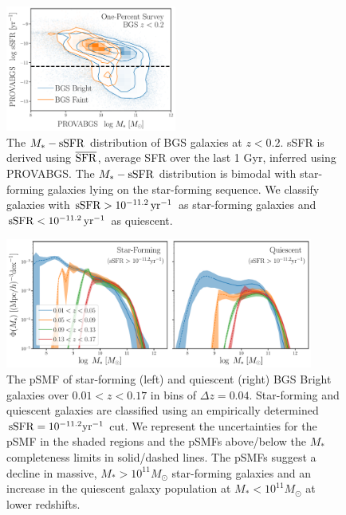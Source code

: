 \begin{figure}
\begin{center}
    \includegraphics[width=0.5\textwidth]{figs/sfq.pdf} 
    \caption{
        The $M_*-{\rm sSFR}$ distribution of BGS galaxies at $z < 0.2$. 
        sSFR is derived using $\overline{\rm SFR}$, average SFR over the last 1
        Gyr, inferred using PROVABGS. 
        The $M_*-{\rm sSFR}$ distribution is bimodal with star-forming galaxies
        lying on the star-forming sequence.
        We classify galaxies with ${\rm sSFR} > 10^{-11.2}\,{\rm yr}^{-1}$ as
        star-forming galaxies and ${\rm sSFR} < 10^{-11.2}\,{\rm yr}^{-1}$ as
        quiescent. 
    }\label{fig:sfq}
\end{center}
\end{figure}


\begin{figure}
\begin{center}
    \includegraphics[width=0.9\textwidth]{figs/psmf_bgs_bright_sfq.pdf} 
    \caption{
        The pSMF of star-forming (left) and quiescent (right) BGS Bright
        galaxies over $0.01 < z < 0.17$ in bins of $\Delta z = 0.04$. 
        Star-forming and quiescent galaxies are classified using an empirically
        determined ${\rm sSFR} = 10^{-11.2}{\rm yr}^{-1}$ cut. 
        We represent the uncertainties for the pSMF in the shaded regions and 
        the pSMFs above/below the $M_*$ completeness limits in solid/dashed
        lines.
        The pSMFs suggest a decline in massive, $M_* > 10^{11}M_\odot$ 
        star-forming galaxies and an increase in the quiescent galaxy population
        at $M_* < 10^{11}M_\odot$ at lower redshifts.
    }\label{fig:sfqsmf}
\end{center}
\end{figure}

